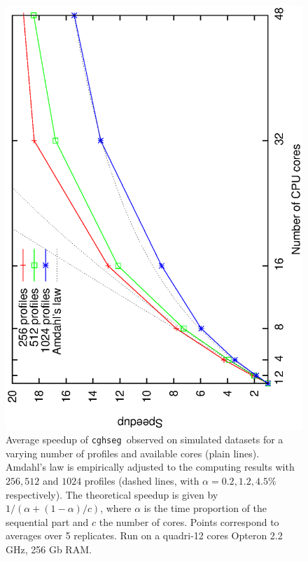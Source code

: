 \documentclass[11pt]{llncs}
\newcommand{\esoft}{\texttt{cghseg }}
\begin{document}
{\begin{figure}[h!]
  \begin{center}
    \includegraphics[scale=0.4,angle=270]{figures/speedup.ps}
    \caption{Average speedup of \esoft observed  on simulated datasets for a varying number of profiles and available cores (plain lines). Amdahl's law is empirically adjusted to the computing results with $256,512$ and $1024$ profiles (dashed lines, with $\alpha=0.2,1.2,4.5\%$ respectively). The theoretical speedup is given by $1/(\alpha+(1-\alpha)/c)$, where $\alpha$ is the time proportion of the sequential part and $c$ the number of cores. Points correspond to averages over 5 replicates. Run on a quadri-12 cores Opteron 2.2 GHz, 256 Gb RAM.}
    \label{figspeedup}
  \end{center}
\end{figure}

}
\end{document}

